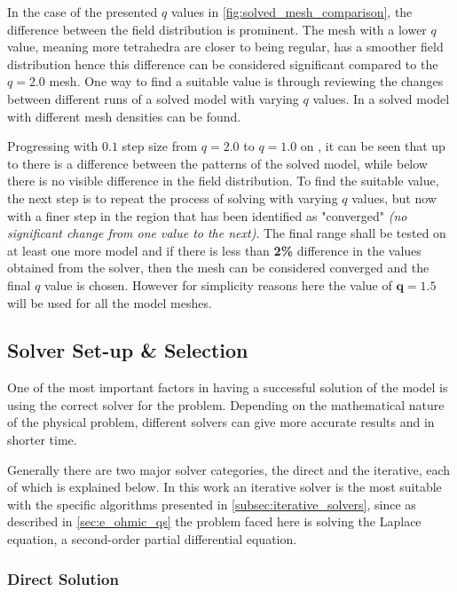 In the case of the presented $q$ values in \autoref{fig:solved_mesh_comparison}, the difference between the field distribution is prominent. The mesh with a lower $q$ value, meaning more tetrahedra are closer to being regular, has a smoother field distribution hence this difference can be considered significant compared to the $q=2.0$ mesh. One way to find a suitable value is through reviewing the changes between different runs of a solved model with varying $q$ values. In  a solved model with different mesh densities can be found.


Progressing with $0.1$ step size from $q=2.0$ to $q=1.0$ on , it can be seen that up to  there is a difference between the patterns of the solved model, while below  there is no visible difference in the field distribution. To find the suitable value, the next step is to repeat the process of solving with varying $q$ values, but now with a finer step in the region that has been identified as "converged" \textit{(no significant change from one value to the next)}. The final range shall be tested on at least one more model and if there is less than \textbf{2\%} difference in the values obtained from the solver, then the mesh can be considered converged and the final $q$ value is chosen. However for simplicity reasons here the value of $\boldsymbol{q=1.5}$ will be used for all the model meshes.
\subsection{Solver Set-up \& Selection}

One of the most important factors in having a successful solution of the model is using the correct solver for the problem. Depending on the mathematical nature of the physical problem, different solvers can give more accurate results and in shorter time.

Generally there are two major solver categories, the direct and the iterative, each of which is explained below. In this work an iterative solver is the most suitable with the specific algorithms presented in \ref{subsec:iterative_solvers}, since as described in \ref{sec:e_ohmic_qs} the problem faced here is solving the Laplace equation, a second-order partial differential equation.

\subsubsection{Direct Solution}

